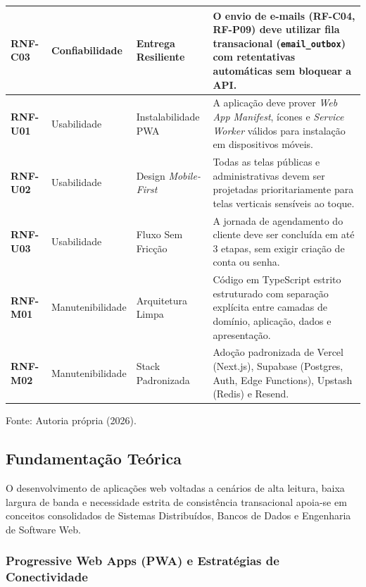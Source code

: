 \documentclass[12pt,a4paper]{article}
\begin{document}
\begin{table}[hbt]
\begin{tabularx}{\textwidth}{|l|l|p{3.3cm}|X|}
\textbf{RNF-C03} & Confiabilidade & Entrega Resiliente & O envio de e-mails (RF-C04, RF-P09) deve utilizar fila transacional (\texttt{email\_outbox}) com retentativas automáticas sem bloquear a API. \\ \hline
\textbf{RNF-U01} & Usabilidade & Instalabilidade PWA & A aplicação deve prover \textit{Web App Manifest}, ícones e \textit{Service Worker} válidos para instalação em dispositivos móveis. \\ \hline
\textbf{RNF-U02} & Usabilidade & Design \textit{Mobile-First} & Todas as telas públicas e administrativas devem ser projetadas prioritariamente para telas verticais sensíveis ao toque. \\ \hline
\textbf{RNF-U03} & Usabilidade & Fluxo Sem Fricção & A jornada de agendamento do cliente deve ser concluída em até 3 etapas, sem exigir criação de conta ou senha. \\ \hline
\textbf{RNF-M01} & Manutenibilidade & Arquitetura Limpa & Código em TypeScript estrito estruturado com separação explícita entre camadas de domínio, aplicação, dados e apresentação. \\ \hline
\textbf{RNF-M02} & Manutenibilidade & Stack Padronizada & Adoção padronizada de Vercel (Next.js), Supabase (Postgres, Auth, Edge Functions), Upstash (Redis) e Resend. \\ \hline
\end{tabularx}
\vspace{0.1cm}
{\footnotesize Fonte: Autoria própria (2026).}
\end{table}


\subsection{Fundamentação Teórica}
\label{subsec:fundamentacao_teorica}

O desenvolvimento de aplicações web voltadas a cenários de alta leitura, baixa largura de banda e necessidade estrita de consistência transacional apoia-se em conceitos consolidados de Sistemas Distribuídos, Bancos de Dados e Engenharia de Software Web.

\subsubsection{Progressive Web Apps (PWA) e Estratégias de Conectividade}
\label{subsubsec:pwa_conectividade}
\end{document}
